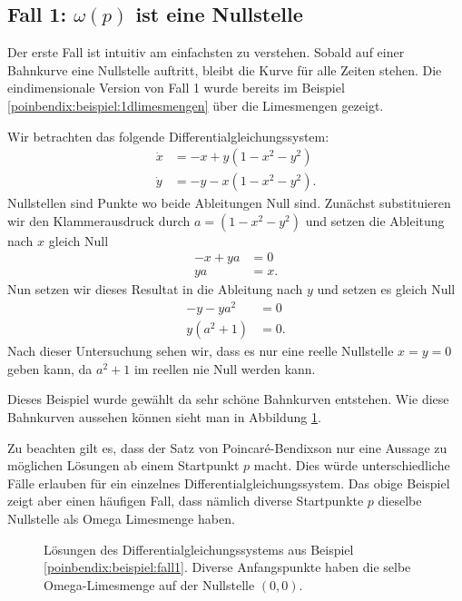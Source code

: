 \subsection{Fall 1: $\omega(p)$ ist eine Nullstelle} \label{poinbendix:subsection:fall1}

Der erste Fall ist intuitiv am einfachsten zu verstehen.
Sobald auf einer Bahnkurve eine Nullstelle auftritt, bleibt die Kurve für alle Zeiten stehen.
Die eindimensionale Version von Fall 1  wurde bereits im Beispiel \ref{poinbendix:beispiel:1dlimesmengen} über die Limesmengen gezeigt.

\begin{beispiel} \label{poinbendix:beispiel:fall1}
Wir betrachten das folgende Differentialgleichungssystem:
\begin{align*}
    \dot{x} &= -x + y(1-x^2-y^2) \\
    \dot{y} &= -y - x(1-x^2-y^2).
\end{align*}
Nullstellen sind Punkte wo beide Ableitungen Null sind.
Zunächst substituieren wir den Klammerausdruck durch $a = (1-x^2-y^2)$ und setzen die Ableitung nach $x$ gleich Null
\begin{align*}
    -x + ya &= 0 \\
    ya &= x.
\end{align*}
Nun setzen wir dieses Resultat in die Ableitung nach $y$ und setzen es gleich Null
\begin{align*}
    -y - ya^2 &= 0 \\
    y(a^2+1) &= 0.
\end{align*}
Nach dieser Untersuchung sehen wir, dass es nur eine reelle Nullstelle $x=y=0$ geben kann, da $a^2 + 1$ im reellen nie Null werden kann.

Dieses Beispiel wurde gewählt da sehr schöne Bahnkurven entstehen.
Wie diese Bahnkurven aussehen können sieht man in Abbildung \ref{poinbendix:fig:fixed_point_omega_set}.
\end{beispiel}

Zu beachten gilt es, dass der Satz von Poincaré-Bendixson nur eine Aussage zu möglichen Lösungen ab einem Startpunkt $p$ macht.
Dies würde unterschiedliche Fälle erlauben für ein einzelnes Differentialgleichungssystem.
Das obige Beispiel zeigt aber einen häufigen Fall, dass nämlich diverse Startpunkte $p$ dieselbe Nullstelle als Omega Limesmenge haben.

\begin{figure}
    \centering
    
    \caption{Lösungen des Differentialgleichungssystems aus Beispiel \ref{poinbendix:beispiel:fall1}.
    Diverse Anfangspunkte haben die selbe Omega-Limesmenge auf der Nullstelle $(0,0)$.}
    \label{poinbendix:fig:fixed_point_omega_set}
\end{figure}

